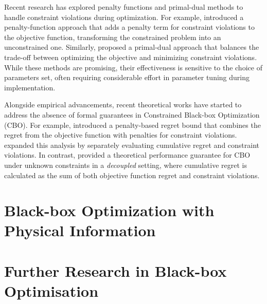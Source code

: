 Recent research has explored penalty functions and primal-dual methods to handle constraint violations during optimization. For example, \citet{lu2022no} introduced a penalty-function approach that adds a penalty term for constraint violations to the objective function, transforming the constrained problem into an unconstrained one. Similarly, \citep{zhou2022kernelized} proposed a primal-dual approach that balances the trade-off between optimizing the objective and minimizing constraint violations. While these methods are promising, their effectiveness is sensitive to the choice of parameters set, often requiring considerable effort in parameter tuning during implementation.

Alongside empirical advancements, recent theoretical works have started to address the absence of formal guarantees in Constrained Black-box Optimization (CBO). For example, \citet{lu2022no} introduced a penalty-based regret bound that combines the regret from the objective function with penalties for constraint violations. \citet{xu2023constrained} expanded this analysis by separately evaluating cumulative regret and constraint violations. In contrast, \citet{nguyen2023optimistic} provided a theoretical performance guarantee for CBO under unknown constraints in a \textit{decoupled} setting, where cumulative regret is calculated as the sum of both objective function regret and constraint violations.
\section{Black-box Optimization with Physical Information}
\label{section:bo_physics}

\section{Further Research in Black-box Optimisation}
\label{section:bo_further_research}


